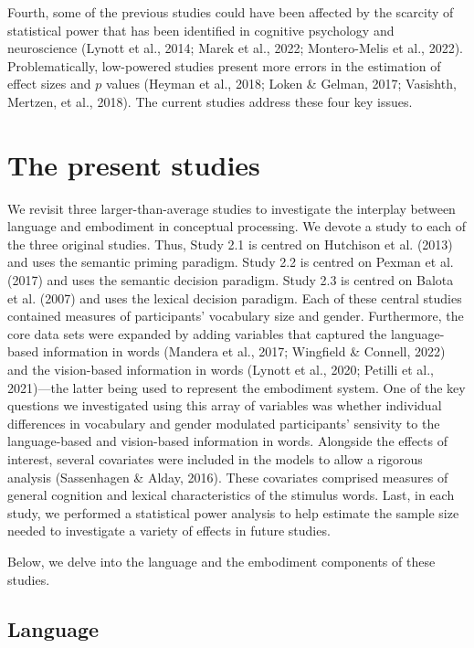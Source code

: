 \documentclass[
  12pt,
  man,floatsintext]{apa7}
\begin{document}
Fourth, some of the previous studies could have been affected by the scarcity of statistical power that has been identified in cognitive psychology and neuroscience (Lynott et al., 2014; Marek et al., 2022; Montero-Melis et al., 2022). Problematically, low-powered studies present more errors in the estimation of effect sizes and \(p\) values (Heyman et al., 2018; Loken \& Gelman, 2017; Vasishth, Mertzen, et al., 2018). The current studies address these four key issues.

\hypertarget{present-studies}{%
\section{The present studies}\label{present-studies}}

We revisit three larger-than-average studies to investigate the interplay between language and embodiment in conceptual processing. We devote a study to each of the three original studies. Thus, Study 2.1 is centred on Hutchison et al. (2013) and uses the semantic priming paradigm. Study 2.2 is centred on Pexman et al. (2017) and uses the semantic decision paradigm. Study 2.3 is centred on Balota et al. (2007) and uses the lexical decision paradigm. Each of these central studies contained measures of participants' vocabulary size and gender. Furthermore, the core data sets were expanded by adding variables that captured the language-based information in words (Mandera et al., 2017; Wingfield \& Connell, 2022) and the vision-based information in words (Lynott et al., 2020; Petilli et al., 2021)---the latter being used to represent the embodiment system. One of the key questions we investigated using this array of variables was whether individual differences in vocabulary and gender modulated participants' sensivity to the language-based and vision-based information in words. Alongside the effects of interest, several covariates were included in the models to allow a rigorous analysis (Sassenhagen \& Alday, 2016). These covariates comprised measures of general cognition and lexical characteristics of the stimulus words. Last, in each study, we performed a statistical power analysis to help estimate the sample size needed to investigate a variety of effects in future studies.

Below, we delve into the language and the embodiment components of these studies.

\hypertarget{language}{%
\subsection{Language}\label{language}}
\end{document}

